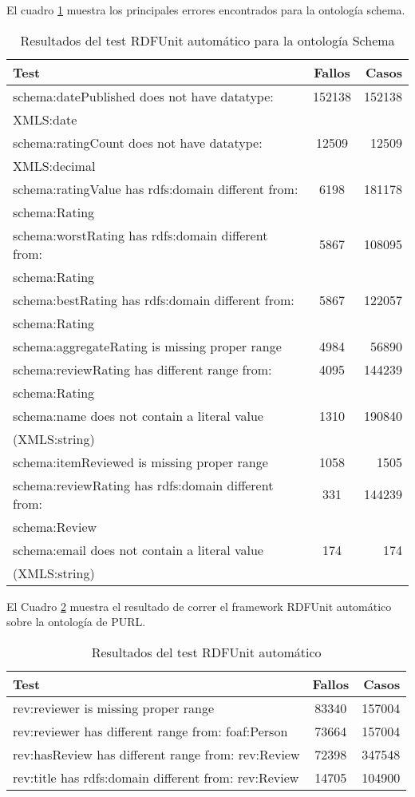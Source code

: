 El cuadro \ref{table:RDFUnitSchemaAutomatic} muestra los principales errores encontrados para la ontología schema.
\begin{table}[h]
\begin{tabular}{| l | c | r | }\hline
Test & Fallos & Casos \\\hline
 schema:datePublished does not have datatype:& 152138 & 152138\\ XMLS:date & & \\\hline
 schema:ratingCount does not have datatype: & 12509 & 12509\\ XMLS:decimal & & \\\hline
 schema:ratingValue has rdfs:domain different from:& 6198 & 181178\\ schema:Rating & & \\\hline
 schema:worstRating has rdfs:domain different from:& 5867 & 108095\\ schema:Rating & & \\\hline
 schema:bestRating has rdfs:domain different from:& 5867 & 122057\\ schema:Rating & & \\\hline
 schema:aggregateRating is missing proper range & 4984 & 56890\\\hline
 schema:reviewRating has different range from: & 4095 & 144239\\ schema:Rating & & \\\hline
 schema:name does not contain a literal value & 1310 & 190840\\ (XMLS:string) & & \\\hline
 schema:itemReviewed is missing proper range & 1058 & 1505\\\hline
 schema:reviewRating has rdfs:domain different from:& 331 & 144239\\ schema:Review & & \\\hline
 schema:email does not contain a literal value & 174  & 174 \\ (XMLS:string) & & \\\hline
\end{tabular}
\caption{Resultados del test RDFUnit automático para la ontología Schema}
\label{table:RDFUnitSchemaAutomatic}
\end{table}

El Cuadro \ref{table:RDFUnitPurlAutomatic} muestra el resultado de correr el framework RDFUnit automático sobre la ontología de PURL.
\begin{table}[h]
\begin{tabular}{| l | c | r | }\hline
Test & Fallos & Casos \\\hline
 rev:reviewer is missing proper range & 83340 & 157004\\
 rev:reviewer has different range from: foaf:Person & 73664 & 157004\\
 rev:hasReview has different range from: rev:Review & 72398 & 347548\\
 rev:title has rdfs:domain different from: rev:Review & 14705 & 104900 \\ \hline
\end{tabular}
\caption{Resultados del test RDFUnit automático}
\label{table:RDFUnitPurlAutomatic}
\end{table}

